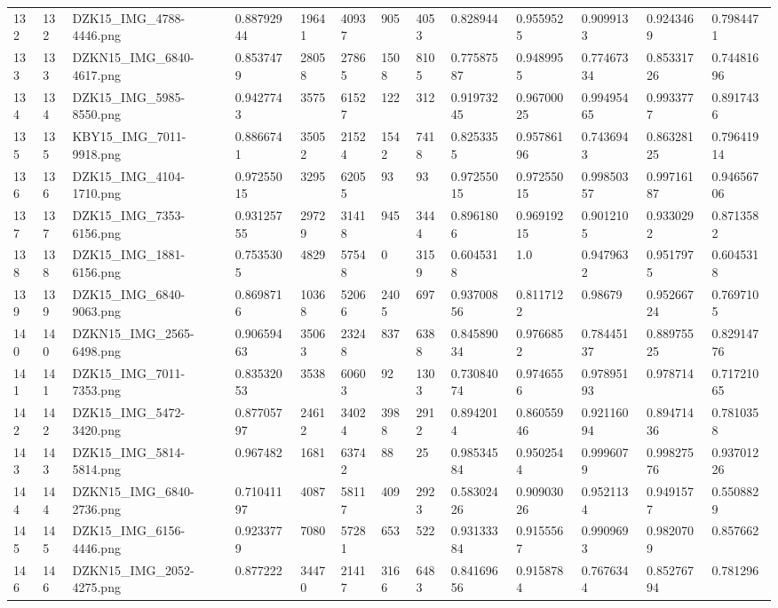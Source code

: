 \documentclass[11pt, a4paper, twoside]{report}
\begin{document}
\begin{longtable}[c]{@{}lllllllllllll@{}}
132 & 132 & DZK15\_IMG\_4788-4446.png & 0.88792944 & 19641 & 40937 & 905 & 4053 & 0.828944 & 0.9559525 & 0.9099133 & 0.9243469 & 0.7984471 \\
133 & 133 & DZKN15\_IMG\_6840-4617.png & 0.8537479 & 28058 & 27865 & 1508 & 8105 & 0.77587587 & 0.9489955 & 0.77467334 & 0.85331726 & 0.74481696 \\
134 & 134 & DZK15\_IMG\_5985-8550.png & 0.9427743 & 3575 & 61527 & 122 & 312 & 0.91973245 & 0.96700025 & 0.99495465 & 0.9933777 & 0.8917436 \\
135 & 135 & KBY15\_IMG\_7011-9918.png & 0.8866741 & 35052 & 21524 & 1542 & 7418 & 0.8253355 & 0.95786196 & 0.7436943 & 0.86328125 & 0.79641914 \\
136 & 136 & DZK15\_IMG\_4104-1710.png & 0.97255015 & 3295 & 62055 & 93 & 93 & 0.97255015 & 0.97255015 & 0.99850357 & 0.99716187 & 0.94656706 \\
137 & 137 & DZK15\_IMG\_7353-6156.png & 0.93125755 & 29729 & 31418 & 945 & 3444 & 0.8961806 & 0.96919215 & 0.9012105 & 0.9330292 & 0.8713582 \\
138 & 138 & DZK15\_IMG\_1881-6156.png & 0.7535305 & 4829 & 57548 & 0 & 3159 & 0.6045318 & 1.0 & 0.9479632 & 0.9517975 & 0.6045318 \\
139 & 139 & DZK15\_IMG\_6840-9063.png & 0.8698716 & 10368 & 52066 & 2405 & 697 & 0.93700856 & 0.8117122 & 0.98679 & 0.95266724 & 0.7697105 \\
140 & 140 & DZKN15\_IMG\_2565-6498.png & 0.90659463 & 35063 & 23248 & 837 & 6388 & 0.84589034 & 0.9766852 & 0.78445137 & 0.88975525 & 0.82914776 \\
141 & 141 & DZK15\_IMG\_7011-7353.png & 0.83532053 & 3538 & 60603 & 92 & 1303 & 0.73084074 & 0.9746556 & 0.97895193 & 0.978714 & 0.71721065 \\
142 & 142 & DZK15\_IMG\_5472-3420.png & 0.87705797 & 24612 & 34024 & 3988 & 2912 & 0.8942014 & 0.86055946 & 0.92116094 & 0.89471436 & 0.7810358 \\
143 & 143 & DZK15\_IMG\_5814-5814.png & 0.967482 & 1681 & 63742 & 88 & 25 & 0.98534584 & 0.9502544 & 0.9996079 & 0.99827576 & 0.93701226 \\
144 & 144 & DZKN15\_IMG\_6840-2736.png & 0.71041197 & 4087 & 58117 & 409 & 2923 & 0.58302426 & 0.90903026 & 0.9521134 & 0.9491577 & 0.5508829 \\
145 & 145 & DZK15\_IMG\_6156-4446.png & 0.9233779 & 7080 & 57281 & 653 & 522 & 0.93133384 & 0.9155567 & 0.9909693 & 0.9820709 & 0.857662 \\
146 & 146 & DZKN15\_IMG\_2052-4275.png & 0.877222 & 34470 & 21417 & 3166 & 6483 & 0.84169656 & 0.9158784 & 0.7676344 & 0.85276794 & 0.781296 \\

\end{longtable}
\end{document}
